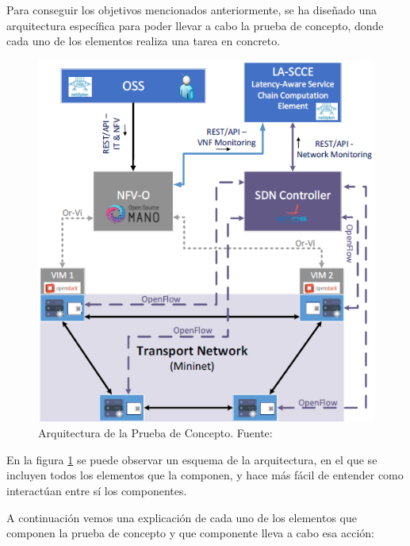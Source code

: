 Para conseguir los objetivos mencionados anteriormente, se ha diseñado una arquitectura específica para poder llevar a cabo la prueba de concepto, donde cada uno de los elementos realiza una tarea en concreto.

\begin{figure}[!ht]
	\centering
	\includegraphics[width=0.9\linewidth]{imagenes/esquema_demo}
	\caption{Arquitectura de la Prueba de Concepto. Fuente:\cite{demoecocbib}}
	\label{fig:esquemademo}
\end{figure}

En la figura \ref{fig:esquemademo} se puede observar un esquema de la arquitectura, en el que se incluyen todos los elementos que la componen, y hace más fácil de entender como interactúan entre sí los componentes.

A continuación vemos una explicación de cada uno de los elementos que componen la prueba de concepto y que componente lleva a cabo esa acción:

